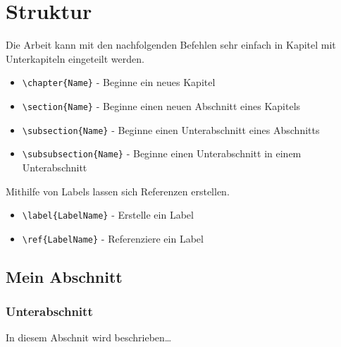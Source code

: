\chapter{Struktur}

Die Arbeit kann mit den nachfolgenden Befehlen sehr einfach in Kapitel mit Unterkapiteln eingeteilt werden.

\begin{itemize}
 \item \verb|\chapter{Name}| - Beginne ein neues Kapitel
 \item \verb|\section{Name}| - Beginne einen neuen Abschnitt eines Kapitels
 \item \verb|\subsection{Name}| - Beginne einen Unterabschnitt eines Abschnitts
 \item \verb|\subsubsection{Name}| - Beginne einen Unterabschnitt in einem Unterabschnitt
\end{itemize}

Mithilfe von Labels lassen sich Referenzen erstellen.

\begin{itemize}
  \item \verb|\label{LabelName}| - Erstelle ein Label
  \item \verb|\ref{LabelName}| - Referenziere ein Label
\end{itemize}

\clearpage

\section{Mein Abschnitt}

\subsection{Unterabschnitt} \label{MeinUnterabschnitt}

In diesem Abschnit wird beschrieben\ldots

